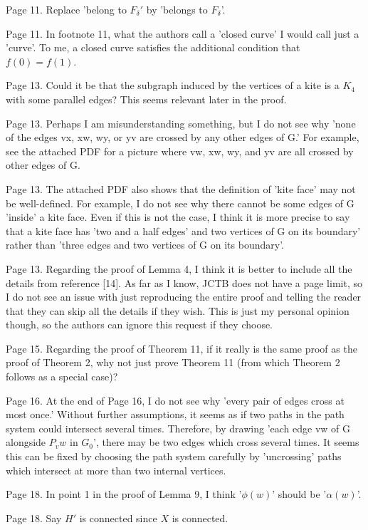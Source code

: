 \documentclass[12pt]{article}
\begin{document}
Page 11. Replace 'belong to $F_\delta'$ by 'belongs to $F_\delta$'.

Page 11. In footnote 11, what the authors call a 'closed curve' I
would call just a 'curve'.  To me, a closed curve satisfies the
additional condition that $f(0)=f(1)$.

Page 13. Could it be that the subgraph induced by the vertices of a
kite is a $K_4$ with some parallel edges?  This seems relevant later in
the proof.

Page 13. Perhaps I am misunderstanding something, but I do not see why
'none of the edges vx, xw, wy, or yv are crossed by any other edges of
G.'  For example, see the attached PDF for a picture where vw, xw, wy,
and yv are all crossed by other edges of G.

Page 13. The attached PDF also shows that the definition of 'kite
face' may not be well-defined.  For example, I do not see why there
cannot be some edges of G 'inside' a kite face.  Even if this is not
the case, I think it is more precise to say that a kite face has 'two
and a half edges' and two vertices of G on its boundary' rather than
'three edges and two vertices of G on its boundary'.

Page 13.  Regarding the proof of Lemma 4, I think it is better to
include all the details from reference [14].  As far as I know, JCTB
does not have a page limit, so I do not see an issue with just
reproducing the entire proof and telling the reader that they can skip
all the details if they wish.  This is just my personal opinion
though, so the authors can ignore this request if they choose.

Page 15. Regarding the proof of Theorem 11, if it really is the same
proof as the proof of Theorem 2, why not just prove Theorem 11 (from
which Theorem 2 follows as a special case)?

Page 16.  At the end of Page 16, I do not see why 'every pair of edges
cross at most once.'  Without further assumptions, it seems as if two
paths in the path system could intersect several times.  Therefore, by
drawing 'each edge vw of G alongside $P_vw$ in $G_0$', there may be two
edges which cross several times.  It seems this can be fixed by
choosing the path system carefully by 'uncrossing' paths which
intersect at more than two internal vertices.

Page 18. In point 1 in the proof of Lemma 9, I think '$\phi(w)$' should
be '$\alpha(w)$'.

Page 18.  Say $H'$ is connected since $X$ is connected.
\end{document}
